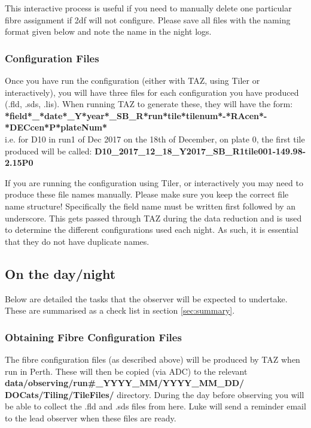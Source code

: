 \documentclass[12pt]{article}
\begin{document}
This interactive process is useful if you need to manually delete one particular fibre assignment if 2df will not configure. Please save all files with the naming format given below and note the name in the night logs.       


\subsubsection{Configuration Files}
\label{sec:config}


Once you have run the configuration (either with TAZ, using Tiler or interactively), you will have three files for each configuration you have produced (.fld, .sds, .lis). When running TAZ to generate these, they will have the form: \\

\hspace{5mm} \textbf{*field*\_*date*\_Y*year*\_SB\_R*run*tile*tilenum*-*RAcen*-*DECcen*P*plateNum*} \\


i.e. for D10 in run1 of Dec 2017 on the 18th of December, on plate 0, the first tile produced will be called:  \textbf{D10\_2017\_12\_18\_Y2017\_SB\_R1tile001-149.98-2.15P0}

If you are running the configuration using Tiler, or interactively you may need to produce these file names manually. Please make sure you keep the correct file name structure! Specifically the field name must be written first followed by an underscore. This gets passed through TAZ during the data reduction and is used to determine the different configurations used each night. As such, it is essential that they do not have duplicate names.  



\subsection{On the day/night}

Below are detailed the tasks that the observer will be expected to undertake. These are summarised as a check list in section \ref{sec:summary}.

\subsubsection{Obtaining Fibre Configuration Files}

The fibre configuration files (as described above) will be produced by TAZ when run in Perth. These will then be copied (via ADC) to the relevant \textbf{data/observing/run\#\_YYYY\_MM/YYYY\_MM\_DD/ \\
DOCats/Tiling/TileFiles/} directory. During the day before observing you will be able to collect the .fld and .sds files from here. Luke will send a reminder email to the lead observer when these files are ready. 
\end{document}
